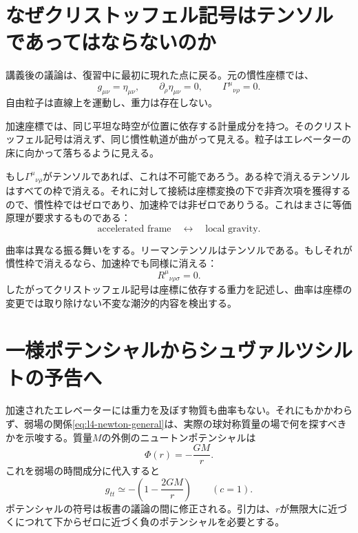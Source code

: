 \section{なぜクリストッフェル記号はテンソルであってはならないのか}

講義後の議論は、復習中に最初に現れた点に戻る。元の慣性座標では、
\begin{equation}
g_{\mu\nu}=\eta_{\mu\nu},
\qquad
\partial_\rho\eta_{\mu\nu}=0,
\qquad
\Gamma^\mu{}_{\nu\rho}=0.
\end{equation}
自由粒子は直線上を運動し、重力は存在しない。

加速座標では、同じ平坦な時空が位置に依存する計量成分を持つ。そのクリストッフェル記号は消えず、同じ慣性軌道が曲がって見える。粒子はエレベーターの床に向かって落ちるように見える。

もし\(\Gamma^\mu{}_{\nu\rho}\)がテンソルであれば、これは不可能であろう。ある枠で消えるテンソルはすべての枠で消える。それに対して接続は座標変換の下で非斉次項を獲得するので、慣性枠ではゼロであり、加速枠では非ゼロでありうる。これはまさに等価原理が要求するものである：
\begin{equation}
\text{accelerated frame}
\quad\longleftrightarrow\quad
\text{local gravity}.
\end{equation}

曲率は異なる振る舞いをする。リーマンテンソルはテンソルである。もしそれが慣性枠で消えるなら、加速枠でも同様に消える：
\begin{equation}
R^\mu{}_{\nu\rho\sigma}=0.
\end{equation}
したがってクリストッフェル記号は座標に依存する重力を記述し、曲率は座標の変更では取り除けない不変な潮汐的内容を検出する。

\section{一様ポテンシャルからシュヴァルツシルトの予告へ}

加速されたエレベーターには重力を及ぼす物質も曲率もない。それにもかかわらず、弱場の関係\eqref{eq:l4-newton-general}は、実際の球対称質量の場で何を探すべきかを示唆する。質量\(M\)の外側のニュートンポテンシャルは
\begin{equation}
\Phi(r)=-\frac{GM}{r}.
\label{eq:l4-newton-potential}
\end{equation}
これを弱場の時間成分に代入すると
\begin{equation}
g_{tt}
\simeq
-\left(1-\frac{2GM}{r}\right)
\qquad(c=1).
\label{eq:l4-schwarzschild-preview}
\end{equation}
ポテンシャルの符号は板書の議論の間に修正される。引力は、\(r\)が無限大に近づくにつれて下からゼロに近づく負のポテンシャルを必要とする。


